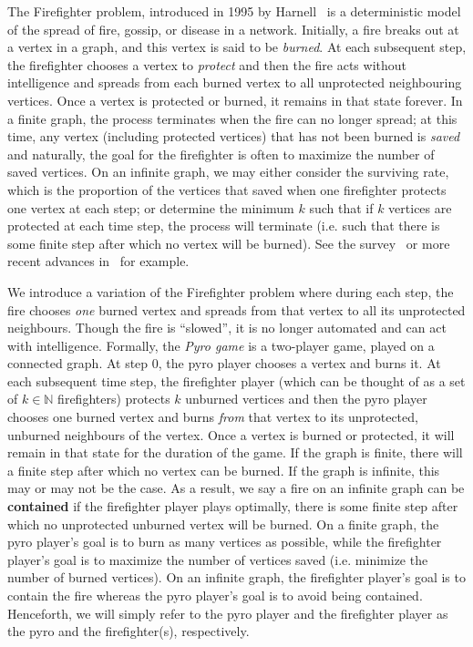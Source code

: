 \documentclass[12pt]{article}
\begin{document}
The Firefighter problem, introduced in 1995 by Harnell~\cite{hart} is a deterministic model of the spread of fire, gossip, or disease in a network.  Initially, a fire breaks out at a vertex in a graph, and this vertex is said to be \emph{burned}.  At each subsequent step, the firefighter chooses a vertex to \emph{protect} and then the fire acts without intelligence and spreads from each burned vertex to all unprotected neighbouring vertices.  Once a vertex is protected or burned, it remains in that state forever.  In a finite graph, the process terminates when the fire can no longer spread; at this time, any vertex (including protected vertices) that has not been burned is \emph{saved} and naturally, the goal for the firefighter is often to maximize the number of saved vertices.  On an infinite graph, we may either consider the surviving rate, which is the proportion of the vertices that saved when one firefighter protects one vertex at each step; or determine the minimum $k$ such that if $k$ vertices are protected at each time step, the process will terminate (i.e. such that there is some finite step after which no vertex will be burned).  See the survey~\cite{FinMac} or more recent advances in~\cite{Blum,Fomin,Garcia,Gav} for example.

We introduce a variation of the Firefighter problem where during each step, the fire chooses \emph{one} burned vertex and spreads from that vertex to all its unprotected neighbours.  Though the fire is ``slowed'', it is  no longer automated and can act with intelligence.  Formally, the \emph{Pyro game} is a two-player game, played on a connected graph.  At step $0$, the pyro player chooses a vertex and burns it.  At each subsequent time step, the firefighter player (which can be thought of as a set of $k \in \mathbb{N}$ firefighters) protects $k$ unburned vertices and then the pyro player chooses one burned vertex and burns \emph{from} that vertex to its unprotected, unburned neighbours of the vertex.  Once a vertex is burned or protected,  it will remain in that state for the duration of the game.  If the graph is finite, there will a finite step after which no vertex can be burned.  If the graph is infinite, this may or may not be the case.  As a result, we say a fire on an infinite graph can be {\bf contained} if the firefighter player plays optimally, there is some finite step after which no unprotected unburned vertex will be burned.   On a finite graph, the pyro player's goal is to burn as many vertices as possible, while the firefighter player's goal is to maximize the number of vertices saved (i.e. minimize the number of burned vertices).  On an infinite graph, the firefighter player's goal is to contain the fire whereas the pyro player's goal is to avoid being contained.  Henceforth, we will simply refer to the pyro player and the firefighter player as the pyro and the firefighter(s), respectively.
\end{document}
